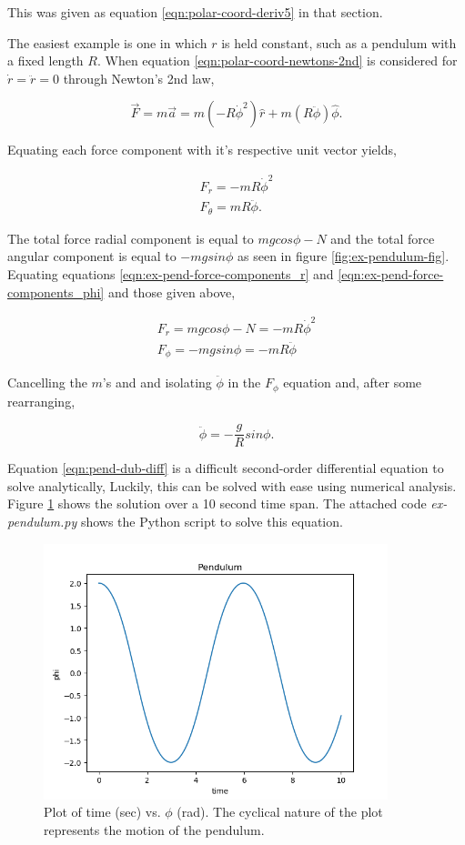 \noindent This was given as equation \ref{eqn:polar-coord-deriv5} in that section.

The easiest example is one in which $r$ is held constant, such as a pendulum with a fixed length $R$. When equation \ref{eqn:polar-coord-newtons-2nd} is considered for $\dot r = \ddot r = 0$ through Newton's 2nd law,

\begin{equation*}
    \vec{F} = m \vec{a} = m(-R \dot \phi^2) \hat r + m(R \ddot \phi) \hat \phi.
\end{equation*}

\noindent Equating each force component with it's respective unit vector yields,

\begin{align}
    \label{eqn:ex-pend-force-components_r}
    F_r = -mR \dot\phi^2 \\
    \label{eqn:ex-pend-force-components_phi}
    F_\theta = mR\ddot\phi.
\end{align}

The total force radial component is equal to $mg cos\phi - N$ and the total force angular component is equal to $-mg sin\phi$ as seen in figure \ref{fig:ex-pendulum-fig}. Equating equations \ref{eqn:ex-pend-force-components_r} and \ref{eqn:ex-pend-force-components_phi} and those given above,

\begin{align*}
    F_r = mg cos\phi - N = -mR \dot \phi^2 \\
    F_\phi = -mg sin\phi = -mR \ddot \phi
\end{align*}

\noindent Cancelling the $m$'s and and isolating $\ddot \phi$ in the $F_\phi$ equation and, after some rearranging,

\begin{equation}
    \label{eqn:pend-dub-diff}
    \ddot \phi = -\frac{g}{R}sin \phi.
\end{equation}

Equation \ref{eqn:pend-dub-diff} is a difficult second-order differential equation to solve analytically, Luckily, this can be solved with ease using numerical analysis. Figure \ref{fig:pend-solve-fig} shows the solution over a 10 second time span. The attached code {\itshape ex-pendulum.py} shows the Python script to solve this equation.

\begin{figure}
    \centering
    \includegraphics[width=10cm]{Classical_Mechanics/2.2-Newton/ex-pendulum-fig.png}
    \caption{Plot of time (sec) vs. $\phi$ (rad). The cyclical nature of the plot represents the motion of the pendulum.}
    \label{fig:pend-solve-fig}
\end{figure}

{\exend}